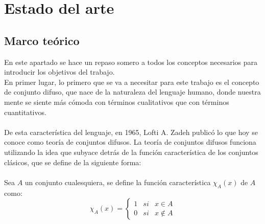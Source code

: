 \chapter{Estado del arte}

\section{Marco teórico}
En este apartado se hace un repaso somero a todos los conceptos necesarios para introducir los objetivos del trabajo. \\
En primer lugar, lo primero que se va a necesitar para este trabajo es el concepto de conjunto difuso, que nace de la  naturaleza del lenguaje humano, donde nuestra mente se siente más cómoda con términos cualitativos que con términos cuantitativos.\\ \\
De esta característica del lenguaje, en 1965, Lofti A. Zadeh publicó lo que hoy se conoce como teoría de conjuntos difusos. La teoría de conjuntos difusos funciona utilizando la idea que subyace detrás de la función característica de los conjuntos clásicos, que se define de la siguiente forma: \\ \\
Sea $A$ un conjunto cualesquiera, se define la función característica $\chi_A(x)$ de $A$ como:
\[
	\chi_A(x) = \left\{
		\begin{array}{ccc}
			1 & si & x \in A \\
			0 & si & x \notin A
		\end{array}
	\right.
\]

